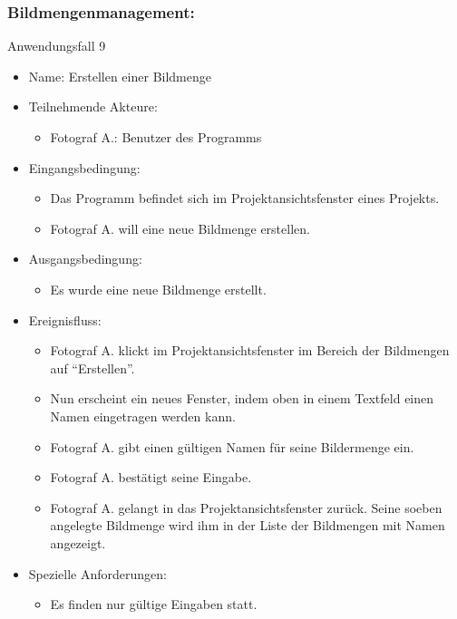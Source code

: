 	\subsubsection{Bildmengenmanagement:}
	
	\begin{description}
		\item[Anwendungsfall 9]
	\end{description}
	
	\begin{itemize}
		\item Name: Erstellen einer Bildmenge
		\item Teilnehmende Akteure:
		\begin{itemize}
			\item	Fotograf A.: Benutzer des Programms		
		\end{itemize}
		\item Eingangsbedingung:
		\begin{itemize}
			\item	Das Programm befindet sich im Projektansichtsfenster eines Projekts.
			\item Fotograf A. will eine neue Bildmenge erstellen.
		\end{itemize}
		\item Ausgangsbedingung:
		\begin{itemize}
			\item	Es wurde eine neue Bildmenge erstellt.	
		\end{itemize}
		\item Ereignisfluss:
		\begin{itemize}
			\item Fotograf A. klickt im Projektansichtsfenster im Bereich der Bildmengen auf "`Erstellen"'.		
			\item Nun erscheint ein neues Fenster, indem oben in einem Textfeld einen Namen eingetragen werden kann.
			\item Fotograf A. gibt einen gültigen Namen für seine Bildermenge ein.
			\item Fotograf A. bestätigt seine Eingabe.
			\item Fotograf A. gelangt in das Projektansichtsfenster zurück. Seine soeben angelegte Bildmenge wird ihm in der Liste der Bildmengen mit Namen angezeigt.
		\end{itemize}
		\item Spezielle Anforderungen:
		\begin{itemize}
			\item	Es finden nur gültige Eingaben statt.		
		\end{itemize}			
	\end{itemize}
	
